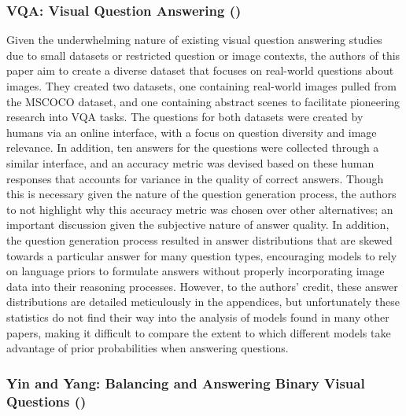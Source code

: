 
\subsubsection*{VQA: Visual Question Answering (\cite{antol2015vqa})}

Given the underwhelming nature of existing visual question answering studies due to small datasets or restricted question or image contexts, the authors of this paper aim to create a diverse dataset that focuses on real-world questions about images. They created two datasets, one containing real-world images pulled from the MSCOCO dataset, and one containing abstract scenes to facilitate pioneering research into VQA tasks. The questions for both datasets were created by humans via an online interface, with a focus on question diversity and image relevance. In addition, ten answers for the questions were collected through a similar interface, and an accuracy metric was devised based on these human responses that accounts for variance in the quality of correct answers. Though this is necessary given the nature of the question generation process, the authors to not highlight why this accuracy metric was chosen over other alternatives; an important discussion given the subjective nature of answer quality. In addition, the question generation process resulted in answer distributions that are skewed towards a particular answer for many question types, encouraging models to rely on language priors to formulate answers without properly incorporating image data into their reasoning processes. However, to the authors' credit, these answer distributions are detailed meticulously in the appendices, but unfortunately these statistics do not find their way into the analysis of models found in many other papers, making it difficult to compare the extent to which different models take advantage of prior probabilities when answering questions.


\subsubsection*{Yin and Yang: Balancing and Answering Binary Visual Questions (\cite{zhang2016yin})}

